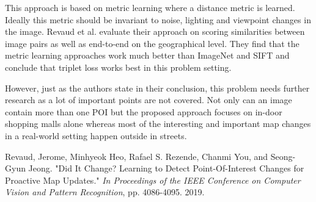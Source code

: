 \documentclass[12pt]{article}
\begin{document}
This approach is based on metric learning where a distance metric is learned. Ideally this metric should be invariant to noise, lighting and viewpoint changes in the image. Revaud et al. evaluate their approach on scoring similarities between image pairs as well as end-to-end on the geographical level. They find that the metric learning approaches work much better than ImageNet and SIFT and conclude that triplet loss works best in this problem setting.

However, just as the authors state in their conclusion, this problem needs further research as a lot of important points are not covered. Not only can an image contain more than one POI but the proposed approach focuses on in-door shopping malls alone whereas most of the interesting and important map changes in a real-world setting happen outside in streets.



\begin{thebibliography}{9}
Revaud, Jerome, Minhyeok Heo, Rafael S. Rezende, Chanmi You, and Seong-Gyun Jeong. "Did It Change? Learning to Detect Point-Of-Interest Changes for Proactive Map Updates." \emph{In Proceedings of the IEEE Conference on Computer Vision and Pattern Recognition}, pp. 4086-4095. 2019.

\end{thebibliography}
 
\end{document}
